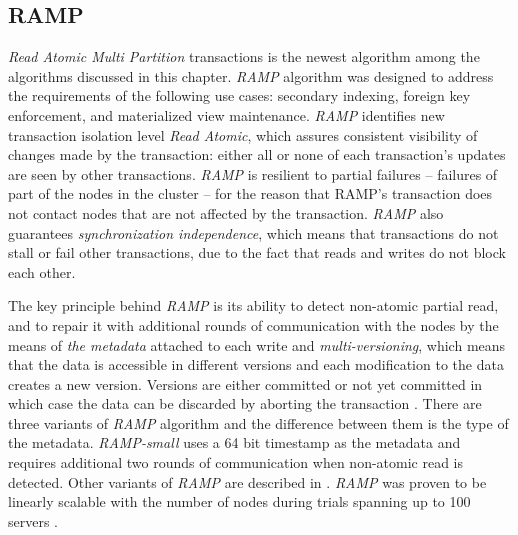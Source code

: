 \subsection{RAMP}\label{sec:theory:transactions:ramp}
\emph{Read Atomic Multi Partition} transactions \cite{Bailis:2014} is the newest algorithm among the algorithms discussed in this chapter. 
\emph{RAMP} algorithm was designed to address the requirements of the following use cases: secondary indexing, foreign key
enforcement, and materialized view maintenance.
\emph{RAMP} identifies new transaction isolation level \emph{Read Atomic}, which 
assures consistent visibility of changes made by the transaction: either all or none of each transaction's updates are seen by other transactions.
\emph{RAMP} is resilient to partial failures -- failures of part of the nodes in the cluster -- for the reason that RAMP's transaction does not contact nodes that are not affected by the transaction. 
\emph{RAMP} also guarantees \emph{synchronization independence}, which means that transactions do not stall or fail other transactions, due to the fact that reads and writes do not block each other. 

The key principle behind \emph{RAMP} is its ability to detect non-atomic partial read, and to repair it with additional rounds of communication with the nodes by the means of \emph{the metadata} attached to each write and \emph{multi-versioning}, which means that the data is accessible in different versions and each modification to the data creates a new version. Versions are either committed or not yet committed in which case the data can be discarded by aborting the transaction \cite[p. 6]{Bailis:2014}. 
There are three variants of \emph{RAMP} algorithm and the difference between them is the type of the metadata. \emph{RAMP-small} uses a 64 bit timestamp as the metadata and requires additional two rounds of communication when non-atomic read is detected. Other variants of \emph{RAMP} are described in \cite[p. 5]{Bailis:2014}.
\emph{RAMP} was proven to be linearly scalable with the number of nodes during trials spanning up to 100 servers \cite[p. 10]{Bailis:2014}.
 

